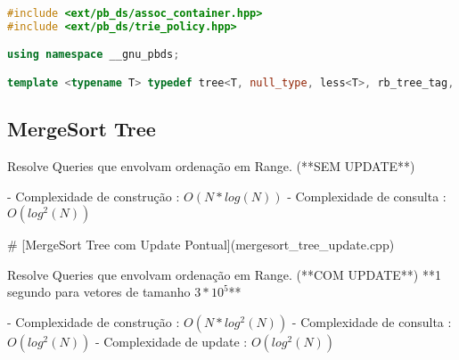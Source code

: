 \documentclass[11pt, a4paper, twoside]{article}
\begin{document}
\begin{lstlisting}[language=C++]
#include <ext/pb_ds/assoc_container.hpp>
#include <ext/pb_ds/trie_policy.hpp>

using namespace __gnu_pbds;

template <typename T> typedef tree<T, null_type, less<T>, rb_tree_tag, tree_order_statistics_node_update> ordered_set;\end{lstlisting}

\subsection{MergeSort Tree}



Resolve Queries que envolvam ordenação em Range. (**SEM UPDATE**)

- Complexidade de construção : $O(N * log(N))$
- Complexidade de consulta : $O(log^2(N))$

\# [MergeSort Tree com Update Pontual](mergesort\_tree\_update.cpp)

Resolve Queries que envolvam ordenação em Range. (**COM UPDATE**)  
**1 segundo para vetores de tamanho $3 * 10^5$**

- Complexidade de construção : $O(N * log^2(N))$
- Complexidade de consulta : $O(log^2(N))$
- Complexidade de update : $O(log^2(N))$
\end{document}

